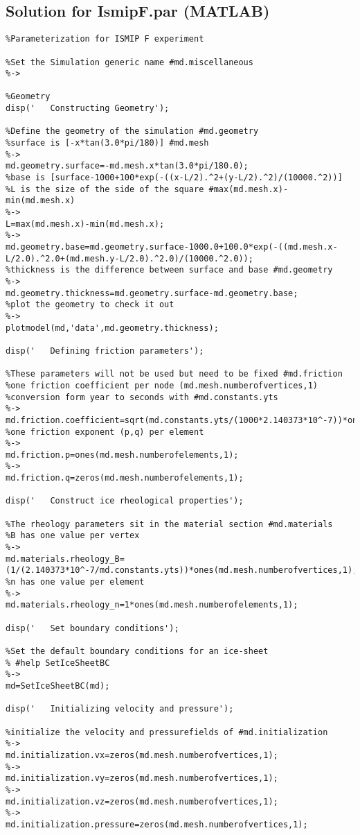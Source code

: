 \subsection{Solution for IsmipF.par (MATLAB)}%
\begin{verbatim}%Parameterization for ISMIP F experiment

%Set the Simulation generic name #md.miscellaneous
%->

%Geometry
disp('   Constructing Geometry');

%Define the geometry of the simulation #md.geometry
%surface is [-x*tan(3.0*pi/180)] #md.mesh
%->
md.geometry.surface=-md.mesh.x*tan(3.0*pi/180.0);
%base is [surface-1000+100*exp(-((x-L/2).^2+(y-L/2).^2)/(10000.^2))]
%L is the size of the side of the square #max(md.mesh.x)-min(md.mesh.x)
%->
L=max(md.mesh.x)-min(md.mesh.x);
%->
md.geometry.base=md.geometry.surface-1000.0+100.0*exp(-((md.mesh.x-L/2.0).^2.0+(md.mesh.y-L/2.0).^2.0)/(10000.^2.0));
%thickness is the difference between surface and base #md.geometry
%->
md.geometry.thickness=md.geometry.surface-md.geometry.base;
%plot the geometry to check it out
%->
plotmodel(md,'data',md.geometry.thickness);

disp('   Defining friction parameters');

%These parameters will not be used but need to be fixed #md.friction
%one friction coefficient per node (md.mesh.numberofvertices,1)
%conversion form year to seconds with #md.constants.yts
%->
md.friction.coefficient=sqrt(md.constants.yts/(1000*2.140373*10^-7))*ones(md.mesh.numberofvertices,1);
%one friction exponent (p,q) per element
%->
md.friction.p=ones(md.mesh.numberofelements,1);
%->
md.friction.q=zeros(md.mesh.numberofelements,1);

disp('   Construct ice rheological properties');

%The rheology parameters sit in the material section #md.materials
%B has one value per vertex
%->
md.materials.rheology_B=(1/(2.140373*10^-7/md.constants.yts))*ones(md.mesh.numberofvertices,1);
%n has one value per element
%->
md.materials.rheology_n=1*ones(md.mesh.numberofelements,1);

disp('   Set boundary conditions');

%Set the default boundary conditions for an ice-sheet
% #help SetIceSheetBC
%->
md=SetIceSheetBC(md);

disp('   Initializing velocity and pressure');

%initialize the velocity and pressurefields of #md.initialization
%->
md.initialization.vx=zeros(md.mesh.numberofvertices,1);
%->
md.initialization.vy=zeros(md.mesh.numberofvertices,1);
%->
md.initialization.vz=zeros(md.mesh.numberofvertices,1);
%->
md.initialization.pressure=zeros(md.mesh.numberofvertices,1);\end{verbatim}
